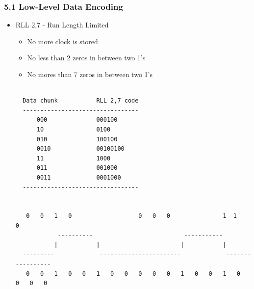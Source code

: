 \begin{frame}[fragile]
  \frametitle{5.1 Low-Level Data Encoding}
        \begin{itemize}
            \item RLL 2,7 - Run Length Limited
            \begin{itemize}
                \item No more clock is stored
		\item No less than 2 zeros in between two 1's
		\item No mores than 7 zeros in between two 1's
            \end{itemize}
\begin{lstlisting}[basicstyle=\tiny]

  Data chunk           RLL 2,7 code
  ---------------------------------
      000              000100
      10               0100
      010              100100
      0010             00100100
      11               1000
      011              001000
      0011             0001000
  ---------------------------------


   0   0   1   0                   0   0   0               1  1            0
            ----------                          -----------
           |           |                       |           |
  ---------             -----------------------             -----------------
   0   0   1   0   0   1   0   0   0   0   0   1   0   0   1   0   0   0   0
			                      
\end{lstlisting}
	\end{itemize}
\end{frame}


